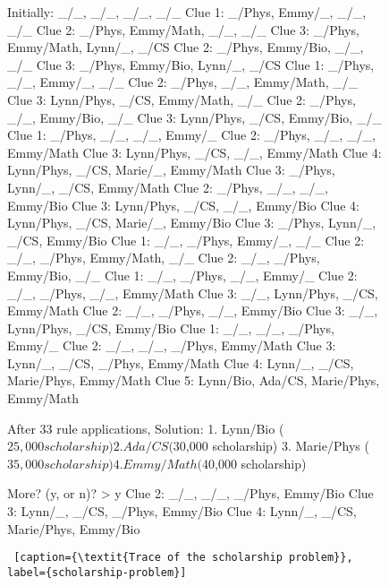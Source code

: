 \begin{figure}[H]%
    \flushright
\begin{minipage}[c]{0.45\textwidth}
\begin{python1}
Initially: _/_, _/_, _/_, _/_
Clue 1: _/Phys, Emmy/_, _/_, _/_
Clue 2: _/Phys, Emmy/Math, _/_, _/_
Clue 3: _/Phys, Emmy/Math, Lynn/_, _/CS
Clue 2: _/Phys, Emmy/Bio, _/_, _/_
Clue 3: _/Phys, Emmy/Bio, Lynn/_, _/CS
Clue 1: _/Phys, _/_, Emmy/_, _/_
Clue 2: _/Phys, _/_, Emmy/Math, _/_
Clue 3: Lynn/Phys, _/CS, Emmy/Math, _/_
Clue 2: _/Phys, _/_, Emmy/Bio, _/_
Clue 3: Lynn/Phys, _/CS, Emmy/Bio, _/_
Clue 1: _/Phys, _/_, _/_, Emmy/_
Clue 2: _/Phys, _/_, _/_, Emmy/Math
Clue 3: Lynn/Phys, _/CS, _/_, Emmy/Math
Clue 4: Lynn/Phys, _/CS, Marie/_, Emmy/Math
Clue 3: _/Phys, Lynn/_, _/CS, Emmy/Math
Clue 2: _/Phys, _/_, _/_, Emmy/Bio
Clue 3: Lynn/Phys, _/CS, _/_, Emmy/Bio
Clue 4: Lynn/Phys, _/CS, Marie/_, Emmy/Bio
Clue 3: _/Phys, Lynn/_, _/CS, Emmy/Bio
Clue 1: _/_, _/Phys, Emmy/_, _/_
Clue 2: _/_, _/Phys, Emmy/Math, _/_
Clue 2: _/_, _/Phys, Emmy/Bio, _/_
Clue 1: _/_, _/Phys, _/_, Emmy/_
Clue 2: _/_, _/Phys, _/_, Emmy/Math
Clue 3: _/_, Lynn/Phys, _/CS, Emmy/Math
Clue 2: _/_, _/Phys, _/_, Emmy/Bio
Clue 3: _/_, Lynn/Phys, _/CS, Emmy/Bio
Clue 1: _/_, _/_, _/Phys, Emmy/_
Clue 2: _/_, _/_, _/Phys, Emmy/Math
Clue 3: Lynn/_, _/CS, _/Phys, Emmy/Math
Clue 4: Lynn/_, _/CS, Marie/Phys, Emmy/Math
Clue 5: Lynn/Bio, Ada/CS, Marie/Phys, Emmy/Math

After 33 rule applications,
Solution: 
	1. Lynn/Bio	($25,000 scholarship)
	2. Ada/CS	($30,000 scholarship)
	3. Marie/Phys	($35,000 scholarship)
	4. Emmy/Math	($40,000 scholarship)

More? (y, or n)? > y
Clue 2: _/_, _/_, _/Phys, Emmy/Bio
Clue 3: Lynn/_, _/CS, _/Phys, Emmy/Bio
Clue 4: Lynn/_, _/CS, Marie/Phys, Emmy/Bio
\end{python1}\linv
\begin{lstlisting} [caption={\textit{Trace of the scholarship problem}}, label={scholarship-problem}]
\end{lstlisting}
\end{minipage} \linv
\end{figure}





